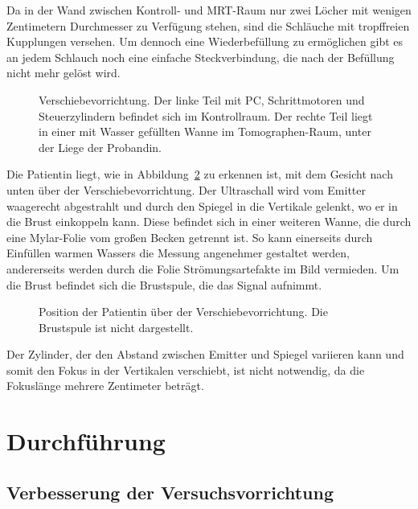 \documentclass[
    11pt,
    ngerman
]{scrreprt}
\begin{document}
Da in der Wand zwischen Kontroll- und MRT-Raum nur zwei Löcher mit wenigen
Zentimetern Durchmesser zu Verfügung stehen, sind die Schläuche mit
tropffreien Kupplungen versehen. Um dennoch eine Wiederbefüllung zu ermöglichen
gibt es an jedem Schlauch noch eine einfache Steckverbindung, die nach der
Befüllung nicht mehr gelöst wird.

\begin{figure}[htbp]
    \centering
    \resizebox{\textwidth}{!}{}
    \caption{%
        Verschiebevorrichtung. Der linke Teil mit PC, Schrittmotoren und Steuerzylindern befindet sich im Kontrollraum. Der rechte Teil liegt in einer mit Wasser gefüllten Wanne im Tomographen-Raum, unter der Liege der Probandin.
    }
    \label{fig:aufbau_total}
\end{figure}

Die Patientin liegt, wie in Abbildung~\ref{fig:aufbau_emitter_spiegel} zu
erkennen ist, mit dem Gesicht nach unten über der Verschiebevorrichtung. Der
Ultraschall wird vom Emitter waagerecht abgestrahlt und durch den Spiegel in
die Vertikale gelenkt, wo er in die Brust einkoppeln kann. Diese befindet sich
in einer weiteren Wanne, die durch eine Mylar-Folie vom großen Becken getrennt
ist. So kann einerseits durch Einfüllen warmen Wassers die Messung angenehmer
gestaltet werden, andererseits werden durch die Folie Strömungsartefakte im
Bild vermieden. Um die Brust befindet sich die Brustspule, die das Signal
aufnimmt.

\begin{figure}[htbp]
    \centering
    \resizebox{.9\textwidth}{!}{}
    \caption{%
        Position der Patientin über der Verschiebevorrichtung. Die Brustspule ist nicht dargestellt.
    }
    \label{fig:aufbau_emitter_spiegel}
\end{figure}

Der Zylinder, der den Abstand zwischen Emitter und Spiegel variieren kann und
somit den Fokus in der Vertikalen verschiebt, ist nicht notwendig, da die
Fokuslänge mehrere Zentimeter beträgt. 

\chapter{Durchführung}

\section{Verbesserung der Versuchsvorrichtung}
\end{document}
